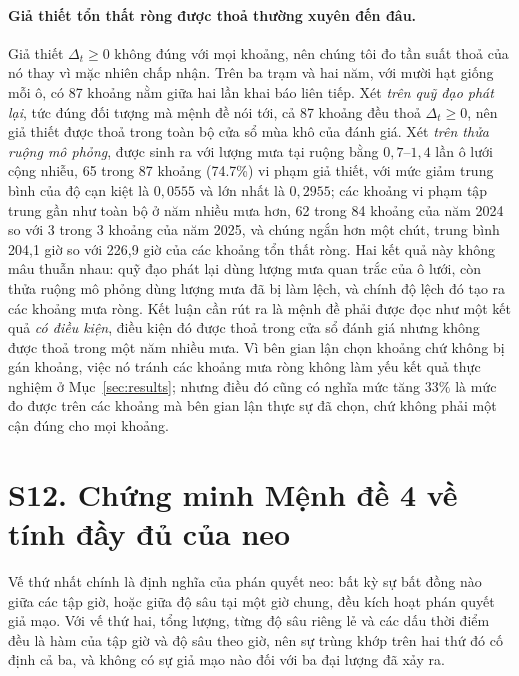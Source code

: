 \paragraph*{Giả thiết tổn thất ròng được thoả thường xuyên đến đâu.}
Giả thiết $\Delta_t\ge0$ không đúng với mọi khoảng, nên chúng tôi đo tần suất
thoả của nó thay vì mặc nhiên chấp nhận. Trên ba trạm và hai năm, với mười hạt giống
mỗi ô, có 87 khoảng nằm giữa hai lần khai báo liên tiếp. Xét \emph{trên quỹ đạo
phát lại}, tức đúng đối tượng mà mệnh đề nói tới, cả 87 khoảng đều thoả
$\Delta_t\ge0$, nên giả thiết được thoả trong toàn bộ cửa sổ mùa khô của
đánh giá. Xét \emph{trên thửa ruộng mô phỏng}, được sinh ra với lượng mưa tại ruộng
bằng $0{,}7$--$1{,}4$ lần ô lưới cộng nhiễu, 65 trong 87 khoảng
(74.7\%) vi phạm giả thiết, với mức giảm trung bình của độ cạn kiệt là
$0{,}0555$ và lớn nhất là $0{,}2955$;
các khoảng vi phạm tập trung gần như toàn bộ ở năm nhiều mưa hơn, 62 trong
84 khoảng của năm 2024 so với 3 trong 3 khoảng của năm 2025, và
chúng ngắn hơn một chút, trung bình 204{,}1 giờ so với 226{,}9 giờ của các
khoảng tổn thất ròng. Hai kết quả này không mâu thuẫn nhau: quỹ đạo phát lại dùng
lượng mưa quan trắc của ô lưới, còn thửa ruộng mô phỏng dùng lượng mưa đã bị làm
lệch, và chính độ lệch đó tạo ra các khoảng mưa ròng. Kết luận cần rút ra là mệnh đề
phải được đọc như một kết quả \emph{có điều kiện}, điều kiện đó được thoả trong cửa
sổ đánh giá nhưng không được thoả trong một năm nhiều mưa. Vì bên gian lận chọn
khoảng chứ không bị gán khoảng, việc nó tránh các khoảng mưa ròng không làm yếu kết
quả thực nghiệm ở Mục~\ref{sec:results}; nhưng điều đó cũng có nghĩa mức tăng
$33\%$ là mức đo được trên các khoảng mà bên gian lận thực sự đã chọn, chứ không
phải một cận đúng cho mọi khoảng.

\section*{S12. Chứng minh Mệnh đề 4 về tính đầy đủ của neo}

Vế thứ nhất chính là định nghĩa của phán quyết neo: bất kỳ sự bất đồng nào giữa các tập giờ,
hoặc giữa độ sâu tại một giờ chung, đều kích hoạt phán quyết giả mạo. Với vế thứ hai, tổng
lượng, từng độ sâu riêng lẻ và các dấu thời điểm đều là hàm của tập giờ và độ sâu theo giờ,
nên sự trùng khớp trên hai thứ đó cố định cả ba, và không có sự giả mạo nào đối với ba đại
lượng đã xảy ra.

